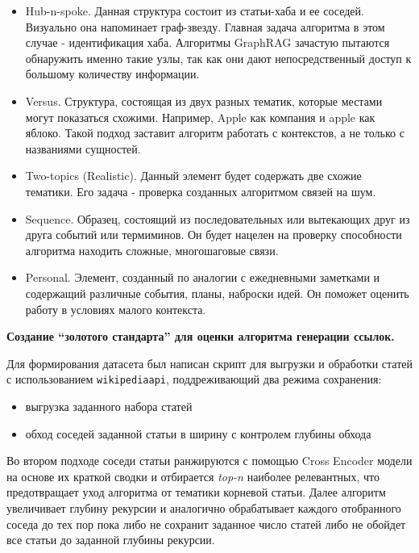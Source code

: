 \begin{itemize}
      \item Hub-n-spoke. Данная структура состоит из статьи-хаба и ее соседей.
            Визуально она напоминает граф-звезду.
            Главная задача алгоритма в этом случае - идентификация хаба.
            Алгоритмы GraphRAG зачастую пытаются обнаружить именно такие узлы,
            так как они дают непосредственный доступ к большому количеству информации.
      \item Versus. Структура, состоящая из двух разных тематик, которые местами могут показаться схожими.
            Например, Apple как компания и apple как яблоко.
            Такой подход заставит алгоритм работать с контекстов, а не только с названиями сущностей.
      \item Two-topics (Realistic). Данный элемент будет содержать две схожие тематики.
            Его задача - проверка созданных алгоритмом связей на шум.
      \item Sequence. Образец,
            состоящий из последовательных или вытекающих друг из друга событий или термиминов.
            Он будет нацелен на проверку способности алгоритма находить сложные, многошаговые связи.
      \item Personal. Элемент,
            созданный по аналогии с ежедневными заметками и содержащий различные события,
            планы, наброски идей.
            Он поможет оценить работу в условиях малого контекста.
\end{itemize}

\textbf{Создание ``золотого стандарта'' для оценки алгоритма генерации ссылок.}

Для формирования датасета был написан скрипт для выгрузки и
обработки статей с использованием \texttt{wikipediaapi},
поддреживающий два режима сохранения:

\begin{itemize}
      \item выгрузка заданного набора статей
      \item обход соседей заданной статьи в ширину с контролем глубины обхода
\end{itemize}

Во втором подходе соседи статьи ранжируются с помощью Cross Encoder модели на основе их краткой сводки
и отбирается \textit{top-n} наиболее релевантных,
что предотвращает уход алгоритма от тематики корневой статьи.
Далее алгоритм увеличивает глубину рекурсии и аналогично обрабатывает каждого отобранного соседа
до тех пор пока либо не сохранит заданное число статей либо не обойдет все статьи до заданной глубины рекурсии.

